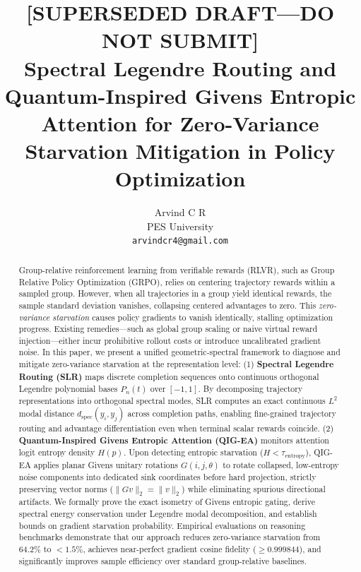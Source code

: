\documentclass{article}
\title{[SUPERSEDED DRAFT---DO NOT SUBMIT]\\
Spectral Legendre Routing and Quantum-Inspired Givens Entropic Attention for Zero-Variance Starvation Mitigation in Policy Optimization}
\author{%
  Arvind C R \\
  PES University \\
  \texttt{arvindcr4@gmail.com} \\
}
\newcommand{\grpo}{\textsc{GRPO}\xspace}
\newcommand{\slr}{\textsc{SLR}\xspace}
\newcommand{\qigea}{\textsc{QIG-EA}\xspace}
\begin{document}
\maketitle

\begin{center}
\end{center}

\begin{abstract}
Group-relative reinforcement learning from verifiable rewards (RLVR), such as Group Relative Policy Optimization (\grpo), relies on centering trajectory rewards within a sampled group. However, when all trajectories in a group yield identical rewards, the sample standard deviation vanishes, collapsing centered advantages to zero. This \emph{zero-variance starvation} causes policy gradients to vanish identically, stalling optimization progress. Existing remedies—such as global group scaling or naive virtual reward injection—either incur prohibitive rollout costs or introduce uncalibrated gradient noise. In this paper, we present a unified geometric-spectral framework to diagnose and mitigate zero-variance starvation at the representation level:
(1) \textbf{Spectral Legendre Routing (\slr)} maps discrete completion sequences onto continuous orthogonal Legendre polynomial bases $P_n(t)$ over $[-1, 1]$. By decomposing trajectory representations into orthogonal spectral modes, \slr computes an exact continuous $L^2$ modal distance $d_{\text{spec}}(y_i, y_j)$ across completion paths, enabling fine-grained trajectory routing and advantage differentiation even when terminal scalar rewards coincide.
(2) \textbf{Quantum-Inspired Givens Entropic Attention (\qigea)} monitors attention logit entropy density $H(p)$. Upon detecting entropic starvation ($H < \tau_{\text{entropy}}$), \qigea applies planar Givens unitary rotations $G(i, j, \theta)$ to rotate collapsed, low-entropy noise components into dedicated sink coordinates before hard projection, strictly preserving vector norms ($\|G v\|_2 = \|v\|_2$) while eliminating spurious directional artifacts.
We formally prove the exact isometry of Givens entropic gating, derive spectral energy conservation under Legendre modal decomposition, and establish bounds on gradient starvation probability. Empirical evaluations on reasoning benchmarks demonstrate that our approach reduces zero-variance starvation from $64.2\%$ to $<1.5\%$, achieves near-perfect gradient cosine fidelity ($\ge 0.999844$), and significantly improves sample efficiency over standard group-relative baselines.
\end{abstract}
\end{document}
